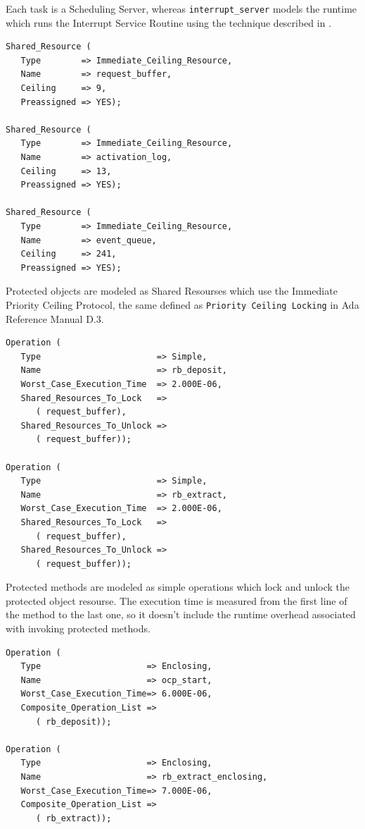 \documentclass{article}
\begin{document}
Each task is a Scheduling Server, whereas \texttt{interrupt\_server} models the runtime which runs the Interrupt Service Routine using the technique described in \cite{interrupt-handler}.

\begin{lstlisting}
Shared_Resource (
   Type        => Immediate_Ceiling_Resource,
   Name        => request_buffer,
   Ceiling     => 9,
   Preassigned => YES);

Shared_Resource (
   Type        => Immediate_Ceiling_Resource,
   Name        => activation_log,
   Ceiling     => 13,
   Preassigned => YES);

Shared_Resource (
   Type        => Immediate_Ceiling_Resource,
   Name        => event_queue,
   Ceiling     => 241,
   Preassigned => YES);
\end{lstlisting}

Protected objects are modeled as Shared Resourses which use the Immediate Priority Ceiling Protocol, the same defined as \texttt{Priority Ceiling Locking} in Ada Reference Manual D.3.

\begin{lstlisting}
Operation (
   Type                       => Simple,
   Name                       => rb_deposit,
   Worst_Case_Execution_Time  => 2.000E-06,
   Shared_Resources_To_Lock   =>
      ( request_buffer),
   Shared_Resources_To_Unlock =>
      ( request_buffer));

Operation (
   Type                       => Simple,
   Name                       => rb_extract,
   Worst_Case_Execution_Time  => 2.000E-06,
   Shared_Resources_To_Lock   =>
      ( request_buffer),
   Shared_Resources_To_Unlock =>
      ( request_buffer));
\end{lstlisting}

Protected methods are modeled as simple operations which lock and unlock the protected object resourse. The execution time is measured from the first line of the method to the last one, so it doesn't include the runtime overhead associated with invoking protected methods.

\begin{lstlisting}
Operation (
   Type                     => Enclosing,
   Name                     => ocp_start,
   Worst_Case_Execution_Time=> 6.000E-06,
   Composite_Operation_List =>
      ( rb_deposit));

Operation (
   Type                     => Enclosing,
   Name                     => rb_extract_enclosing,
   Worst_Case_Execution_Time=> 7.000E-06,
   Composite_Operation_List =>
      ( rb_extract));
\end{lstlisting}
\end{document}
